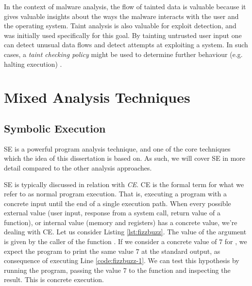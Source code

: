 In the context of malware analysis, the flow of tainted data is valuable because it gives valuable insights about the ways the malware interacts with the user and the operating system. Taint analysis is also valuable for exploit detection, and was initially used specifically for this goal. By tainting untrusted user input one can detect unusual data flows and detect attempts at exploiting a system. In such cases, a \emph{taint checking policy} might be used to determine further behaviour (e.g. halting execution) \cite{da_survey_2019} \cite{all_about_taint_2010}.

\section{Mixed Analysis Techniques}

\subsection{Symbolic Execution}
\label{sec:se}

\gls{SE} is a powerful program analysis technique, and one of the core techniques which the idea of this dissertation is based on. As such, we will cover \gls{SE} in more detail compared to the other analysis approaches.

\gls{SE} is typically discussed in relation with \emph{\gls{CE}}. \gls{CE} is the formal term for what we refer to as normal program execution. That is, executing a program with a concrete input until the end of a single execution path. When every possible external value (user input, response from a system call, return value of a function), or internal value (memory and registers) has a concrete value, we're dealing with \gls{CE}. Let us consider Listing \ref{lst:fizzbuzz}. The value of the argument  is given by the caller of the function . If we consider a concrete value of $7$ for , we expect the program to print the same value $7$ at the standard output, as consequence of executing Line \ref{code:fizzbuzz-1}. We can test this hypothesis by running the program, passing the value $7$ to the function and inspecting the result. This is concrete execution.



